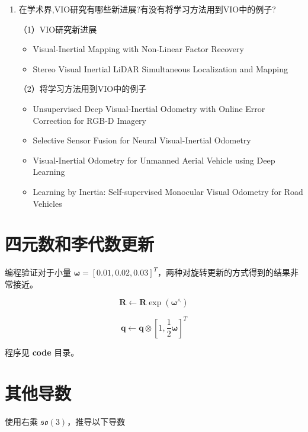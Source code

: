 \documentclass[12pt,a4paper]{article}
\begin{document}
\begin{enumerate}
\item 在学术界,VIO研究有哪些新进展?有没有将学习方法用到VIO中的例子?

（1）VIO研究新进展
 \begin{itemize}
 \item Visual-Inertial Mapping with Non-Linear Factor Recovery
 \item Stereo Visual Inertial LiDAR Simultaneous Localization and Mapping
 \end{itemize}

（2）将学习方法用到VIO中的例子
 \begin{itemize}
 \item Unsupervised Deep Visual-Inertial Odometry with Online Error Correction for RGB-D Imagery
 \item Selective Sensor Fusion for Neural Visual-Inertial Odometry
 \item Visual-Inertial Odometry for Unmanned Aerial Vehicle using Deep Learning
 \item Learning by Inertia: Self-supervised Monocular Visual Odometry for Road Vehicles
 \end{itemize}

\end{enumerate}



\section{四元数和李代数更新}

编程验证对于小量 $\boldsymbol{\omega} = [0.01, 0.02, 0.03]^T$，两种对旋转更新的方式得到的结果非常接近。

\begin{equation}
\mathbf{R} \leftarrow \mathbf{R} \exp(\boldsymbol{\omega}^{\wedge})
\end{equation}

\begin{equation}
\mathbf{q} \leftarrow \mathbf{q} \otimes [1, \frac{1}{2} \boldsymbol{\omega}]^T
\end{equation}

\noindent
程序见 \textbf{code} 目录。



\section{其他导数}

使用右乘 $\mathfrak{so}(3)$，推导以下导数 \cite{Gao2017SLAM}
\end{document}
